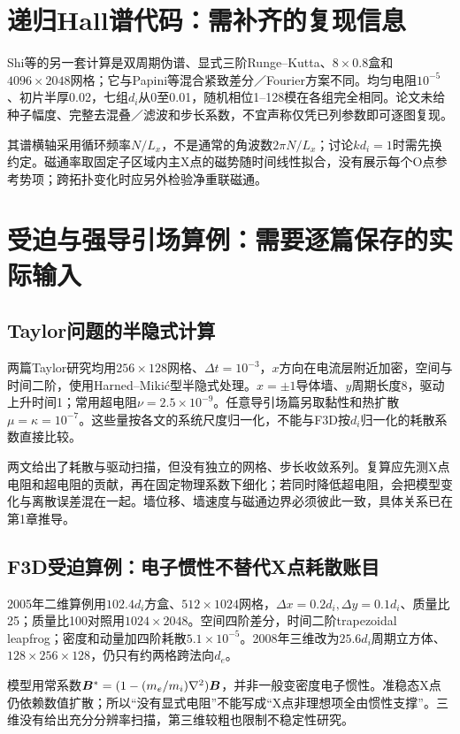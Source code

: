 \documentclass[UTF8,a4paper,11pt,openany,fontset=fandol]{ctexbook}
\begin{document}
\section{递归Hall谱代码：需补齐的复现信息}
Shi等的另一套计算是双周期伪谱、显式三阶Runge--Kutta、$8\times0.8$盒和$4096\times2048$网格；它与Papini等混合紧致差分／Fourier方案不同。均匀电阻$10^{-5}$、初片半厚0.02，七组$d_i$从0至0.01，随机相位1--128模在各组完全相同。论文未给种子幅度、完整去混叠／滤波和步长系数，不宜声称仅凭已列参数即可逐图复现。

其谱横轴采用循环频率$N/L_x$，不是通常的角波数$2\pi N/L_x$；讨论$kd_i=1$时需先换约定。磁通率取固定子区域内主X点的磁势随时间线性拟合，没有展示每个O点参考势项；跨拓扑变化时应另外检验净重联磁通。\citep{L263}

\section{受迫与强导引场算例：需要逐篇保存的实际输入}
\subsection{Taylor问题的半隐式计算}
两篇Taylor研究均用$256\times128$网格、$\Delta t=10^{-3}$，$x$方向在电流层附近加密，空间与时间二阶，使用Harned--Miki\'c型半隐式处理。$x=\pm1$导体墙、$y$周期长度8，驱动上升时间1；常用超电阻$\nu=2.5\times10^{-9}$。任意导引场篇另取黏性和热扩散$\mu=\kappa=10^{-7}$。这些量按各文的系统尺度归一化，不能与F3D按$d_i$归一化的耗散系数直接比较。\citep{L057,L058}

两文给出了耗散与驱动扫描，但没有独立的网格、步长收敛系列。复算应先测X点电阻和超电阻的贡献，再在固定物理系数下细化；若同时降低超电阻，会把模型变化与离散误差混在一起。墙位移、墙速度与磁通边界必须彼此一致，具体关系已在第1章推导。

\subsection{F3D受迫算例：电子惯性不替代X点耗散账目}
2005年二维算例用$102.4d_i$方盒、$512\times1024$网格，$\Delta x=0.2d_i,\Delta y=0.1d_i$、质量比25；质量比100对照用$1024\times2048$。空间四阶差分，时间二阶trapezoidal leapfrog；密度和动量加四阶耗散$5.1\times10^{-5}$。2008年三维改为$25.6d_i$周期立方体、$128\times256\times128$，仍只有约两格跨法向$d_e$。\citep{L076,F717}

模型用常系数$\bm{B}^*=(1-(m_e/m_i)\nabla^2)\bm{B}$，并非一般变密度电子惯性。准稳态X点仍依赖数值扩散；所以“没有显式电阻”不能写成“X点非理想项全由惯性支撑”。三维没有给出充分分辨率扫描，第三维较粗也限制不稳定性研究。
\end{document}
